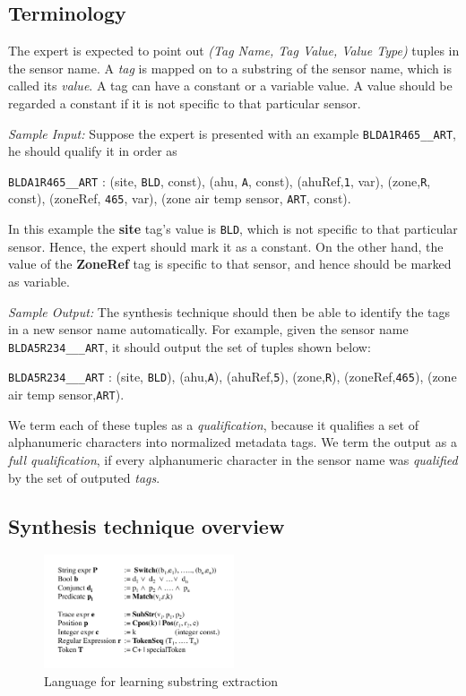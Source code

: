 \subsection{Terminology}

The expert is expected to point out \emph{(Tag Name, Tag Value, Value Type)} tuples in the sensor name. A {\it tag} is mapped on to a substring of the sensor name, which is called its {\it value}. A tag can have a constant or a variable value. A value should be regarded a constant if it is not specific to that particular sensor. 

{\it Sample Input:} Suppose the expert is presented with an example \texttt{BLDA1R465\_\_ART}, he should qualify it in order as

 \texttt{BLDA1R465\_\_ART} : (site, \texttt{BLD}, const), (ahu, \texttt{A}, const), (ahuRef,\texttt{1}, var), (zone,\texttt{R}, const), (zoneRef, \texttt{465}, var), (zone air temp sensor, \texttt{ART}, const). 

In this example the {\bf site} tag's value is \texttt{BLD}, which is not specific to that particular sensor. Hence, the expert should mark it as a constant. On the other hand, the value of the {\bf ZoneRef} tag is specific to that sensor, and hence should be marked as variable.

{\it Sample Output:} The synthesis technique should then be able to identify the tags in a new sensor name automatically. For example, given the sensor name \texttt{BLDA5R234\_\_\_ART}, it should output the set of tuples shown below:

\texttt{BLDA5R234\_\_\_ART} : (site, \texttt{BLD}), (ahu,\texttt{A}), (ahuRef,\texttt{5}), (zone,\texttt{R}), (zoneRef,\texttt{465}), (zone air temp sensor,\texttt{ART}).

We term each of these tuples as a {\it qualification}, because it qualifies a set of alphanumeric characters into normalized metadata tags. We term the output as a {\it full qualification}, if every alphanumeric character in the sensor name was {\it qualified} by the set of outputed {\it tags}.


\subsection{Synthesis technique overview}
\label{sec:synth}

\begin{figure}[h!]
  
  \centering
    \includegraphics[width=0.5\textwidth]{figs/stringLanguage.pdf}
\caption{Language for learning substring extraction}
\label{fig:language}
\end{figure}


